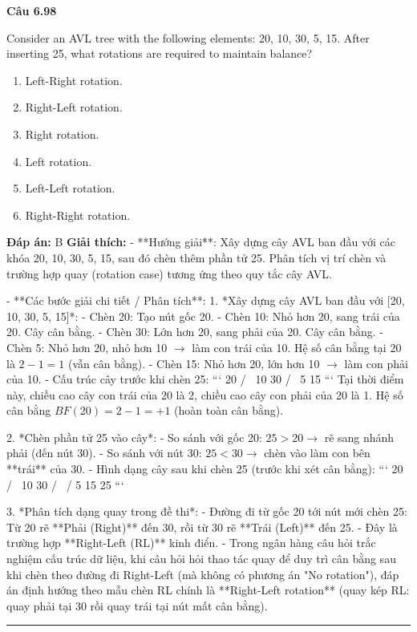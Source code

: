 \documentclass[11pt,a4paper]{article}
\newenvironment{question}[1]{%
  \par\vspace{1em}\noindent\textbf{\large Câu #1}\par\vspace{0.4em}
}{%
  \par\vspace{1em}\hrule\vspace{0.6em}
}
\newenvironment{choices}{%
  \begin{enumerate}[label=\textbf{\Alph*.},leftmargin=2.2em,itemsep=2pt,topsep=3pt]
}{%
  \end{enumerate}
}
\newcommand{\choice}{\item}
\begin{document}
\begin{question}{6.98}
Consider an AVL tree with the following elements: 20, 10, 30, 5, 15. After inserting 25, what rotations are required to maintain balance?
\begin{choices}
\choice Left-Right rotation.
\choice Right-Left rotation.
\choice Right rotation.
\choice Left rotation.
\choice Left-Left rotation.
\choice Right-Right rotation.
\end{choices}
\textbf{Đáp án:} B
\textbf{Giải thích:} - **Hướng giải**:
  Xây dựng cây AVL ban đầu với các khóa 20, 10, 30, 5, 15, sau đó chèn thêm phần tử 25. Phân tích vị trí chèn và trường hợp quay (rotation case) tương ứng theo quy tắc cây AVL.

- **Các bước giải chi tiết / Phân tích**:
  1. *Xây dựng cây AVL ban đầu với [20, 10, 30, 5, 15]*:
     - Chèn 20: Tạo nút gốc 20.
     - Chèn 10: Nhỏ hơn 20, sang trái của 20. Cây cân bằng.
     - Chèn 30: Lớn hơn 20, sang phải của 20. Cây cân bằng.
     - Chèn 5: Nhỏ hơn 20, nhỏ hơn 10 \(\rightarrow\) làm con trái của 10. Hệ số cân bằng tại 20 là \(2 - 1 = 1\) (vẫn cân bằng).
     - Chèn 15: Nhỏ hơn 20, lớn hơn 10 \(\rightarrow\) làm con phải của 10.
     - Cấu trúc cây trước khi chèn 25:
       ```
              20
            /    \
          10      30
         /  \
        5    15
       ```
       Tại thời điểm này, chiều cao cây con trái của 20 là 2, chiều cao cây con phải của 20 là 1. Hệ số cân bằng \(BF(20) = 2 - 1 = +1\) (hoàn toàn cân bằng).

  2. *Chèn phần tử 25 vào cây*:
     - So sánh với gốc 20: \(25 > 20 \rightarrow\) rẽ sang nhánh phải (đến nút 30).
     - So sánh với nút 30: \(25 < 30 \rightarrow\) chèn vào làm con bên **trái** của 30.
     - Hình dạng cây sau khi chèn 25 (trước khi xét cân bằng):
       ```
              20
            /    \
          10      30
         /  \    /
        5   15  25
       ```

  3. *Phân tích dạng quay trong đề thi*:
     - Đường đi từ gốc 20 tới nút mới chèn 25: Từ 20 rẽ **Phải (Right)** đến 30, rồi từ 30 rẽ **Trái (Left)** đến 25.
     - Đây là trường hợp **Right-Left (RL)** kinh điển.
     - Trong ngân hàng câu hỏi trắc nghiệm cấu trúc dữ liệu, khi câu hỏi hỏi thao tác quay để duy trì cân bằng sau khi chèn theo đường đi Right-Left (mà không có phương án "No rotation"), đáp án định hướng theo mẫu chèn RL chính là **Right-Left rotation** (quay kép RL: quay phải tại 30 rồi quay trái tại nút mất cân bằng).


\end{question}
\end{document}
